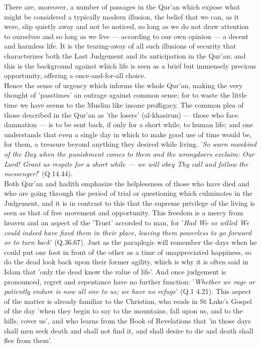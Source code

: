 \documentclass[11pt, b5paper, twoside]{book}
\begin{document}
There are, moreover, a number of passages in the Qur'an which expose what might be considered a 
typically modern illusion, the belief that we can, as it were, slip quietly away and not be noticed, 
so long as we do not draw attention to ourselves and so long as we live --- according to our own 
opinion --- a decent and harmless life. It is the tearing-away of all such illusions of security that 
characterizes both the Last Judgement and its anticipation in the Qur'an; and this is the background 
against which life is seen as a brief but immensely precious opportunity, offering a once-and-for-all 
choice. \\

Hence the sense of urgency which informs the whole Qur'an, making the very thought of 'passtimes' an 
outrage against common sense; for to waste the little time we have seems to the Muslim like insane 
profligacy. The common plea of those described in the Qur'an as 'the losers' (al-khasirun) --- those 
who face damnation --- is to be sent back, if only for a short while, to human life; and one 
understands that even a single day in which to make good use of time would be, for them, a treasure 
beyond anything they desired while living. '\emph{So warn mankind of the Day when the punishment comes to them and the wrongdoers exclaim: Our Lord! Grant us respite for a short while --- we will obey Thy call and follow the messenger!}' (Q.14.44). \\

Both Qur'an and hadith emphasize the helplessness of those who have died and who are going through 
the period of trial or questioning which culminates in the Judgement, and it is in contrast to this 
that the supreme privilege of the living is seen as that of free movement and opportunity. This 
freedom is a mercy from heaven and an aspect of the 'Trust' accorded to man, for '\emph{Had We so willed We could indeed have fixed them in their place, leaving them powerless to go forward or to turn 
back}' (Q.36.67). Just as the paraplegic will remember the days when he could put one foot in front of 
the other as a time of unappreciated happiness, so do the dead look back upon their former agility, 
which is why it is often said in Islam that 'only the dead know the value of life'. And once 
judgement is pronounced, regret and repentance have no further function: '\emph{Whether we rage or 
patiently endure is now all one to us; we have no refuge}' (Q.1 4.21). This aspect of the matter is 
already familiar to the Christian, who reads in St Luke's Gospel of the day 'when they begin to say 
to the mountains, fall upon us, and to the hills, cover us', and who learns from the Book of 
Revelations that 'in those days shall men seek death and shall not find it, and shall desire to die 
and death shall flee from them'. \\
\end{document}
